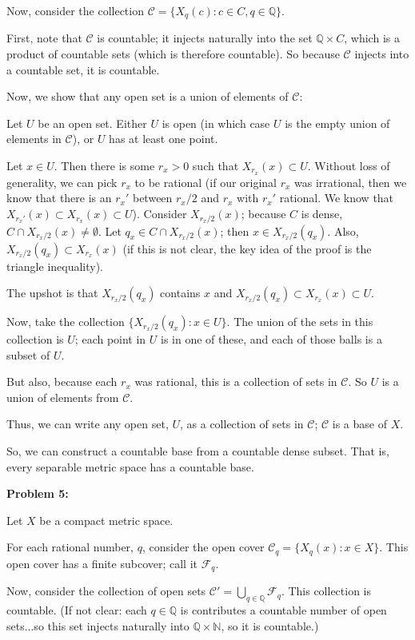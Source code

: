 \documentclass[a4paper,12pt]{article}
\newcommand{\tab}{\hspace{4mm}} %
\newcommand{\shunt}{\vspace{20mm}}
\newcommand{\N}{\mathbb{N}}
\newcommand{\Q}{\mathbb{Q}}
\newcommand{\scrC}{\mathcal{C}}
\newcommand{\scrF}{\mathcal{F}}
\begin{document}
Now, consider the collection $\scrC = \{X_q(c): c \in C, q \in \Q\}$.

First, note that $\scrC$ is countable; it injects naturally into the set $\Q \times C$, which is a product of countable sets (which is therefore countable). So because $\scrC$ injects into a countable set, it is countable.

Now, we show that any open set is a union of elements of $\scrC$:

\tab Let $U$ be an open set. Either $U$ is open (in which case $U$ is the empty union of elements in $\scrC$), or $U$ has at least one point.

\tab Let $x \in U$. Then there is some $r_x>0$ such that $X_{r_x}(x) \subset U$. Without loss of generality, we can pick $r_x$ to be rational (if our original $r_x$ was irrational, then we know that there is an $r_x'$ between $r_x/2$ and $r_x$ with $r_x'$ rational. We know that $X_{r_x'}(x) \subset X_{r_x}(x) \subset U$). Consider $X_{r_x/2}(x)$; because $C$ is dense, $C \cap X_{r_x/2}(x) \neq \emptyset$. Let $q_x \in C \cap X_{r_x/2}(x)$; then $x \in X_{r_x/2}(q_x)$. Also, $X_{r_x/2}(q_x) \subset X_{r_x}(x)$ (if this is not clear, the key idea of the proof is the triangle inequality).

\tab The upshot is that $X_{r_x/2}(q_x)$ contains $x$ and $X_{r_x/2}(q_x) \subset X_{r_x}(x) \subset U$.

\tab Now, take the collection $\{X_{r_x/2}(q_x): x \in U\}$. The union of the sets in this collection is $U$; each point in $U$ is in one of these, and each of those balls is a subset of $U$. 

\tab But also, because each $r_x$ was rational, this is a collection of sets in $\scrC$. So $U$ is a union of elements from $\scrC$.

\tab Thus, we can write any open set, $U$, as a collection of sets in $\scrC$; $\scrC$ is a base of $X$.

So, we can construct a countable base from a countable dense subset. That is, every separable metric space has a countable base.

\shunt

{\bf Problem 5:}

Let $X$ be a compact metric space.

For each rational number, $q$, consider the open cover $\scrC_q = \{X_q(x): x \in X\}$. This open cover has a finite subcover; call it $\scrF_q$.

Now, consider the collection of open sets $\scrC' = \bigcup\limits_{q \in \Q} \scrF_q$. This collection is countable. (If not clear: each $q \in \Q$ is contributes a countable number of open sets...so this set injects naturally into $\Q \times \N$, so it is countable.)
\end{document}
